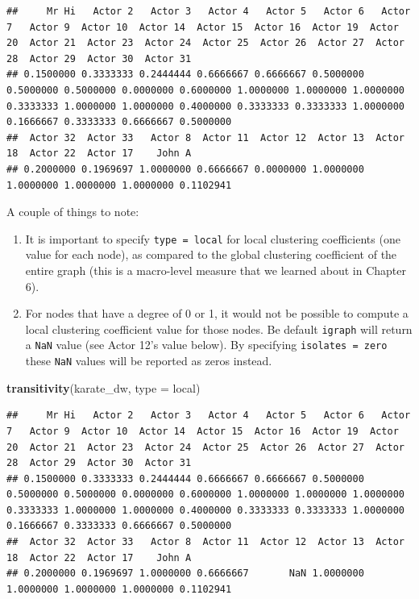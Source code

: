 \documentclass[
]{book}
\newenvironment{Shaded}{\begin{snugshade}}{\end{snugshade}}
\newcommand{\AttributeTok}[1]{\textcolor[rgb]{0.13,0.29,0.53}{#1}}
\newcommand{\FunctionTok}[1]{\textcolor[rgb]{0.13,0.29,0.53}{\textbf{#1}}}
\newcommand{\NormalTok}[1]{#1}
\newcommand{\StringTok}[1]{\textcolor[rgb]{0.31,0.60,0.02}{#1}}
\begin{document}
\begin{verbatim}
##     Mr Hi   Actor 2   Actor 3   Actor 4   Actor 5   Actor 6   Actor 7   Actor 9  Actor 10  Actor 14  Actor 15  Actor 16  Actor 19  Actor 20  Actor 21  Actor 23  Actor 24  Actor 25  Actor 26  Actor 27  Actor 28  Actor 29  Actor 30  Actor 31 
## 0.1500000 0.3333333 0.2444444 0.6666667 0.6666667 0.5000000 0.5000000 0.5000000 0.0000000 0.6000000 1.0000000 1.0000000 1.0000000 0.3333333 1.0000000 1.0000000 0.4000000 0.3333333 0.3333333 1.0000000 0.1666667 0.3333333 0.6666667 0.5000000 
##  Actor 32  Actor 33   Actor 8  Actor 11  Actor 12  Actor 13  Actor 18  Actor 22  Actor 17    John A 
## 0.2000000 0.1969697 1.0000000 0.6666667 0.0000000 1.0000000 1.0000000 1.0000000 1.0000000 0.1102941
\end{verbatim}

A couple of things to note:

\begin{enumerate}
\def\labelenumi{\arabic{enumi}.}
\item
  It is important to specify \texttt{type\ =\ local} for local clustering coefficients (one value for each node), as compared to the global clustering coefficient of the entire graph (this is a macro-level measure that we learned about in Chapter 6).
\item
  For nodes that have a degree of 0 or 1, it would not be possible to compute a local clustering coefficient value for those nodes. Be default \texttt{igraph} will return a \texttt{NaN} value (see Actor 12's value below). By specifying \texttt{isolates\ =\ \textquotesingle{}zero\textquotesingle{}} these \texttt{NaN} values will be reported as zeros instead.
\end{enumerate}

\begin{Shaded}
\begin{Highlighting}[]
\FunctionTok{transitivity}\NormalTok{(karate\_dw, }\AttributeTok{type =} \StringTok{\textquotesingle{}local\textquotesingle{}}\NormalTok{)}
\end{Highlighting}
\end{Shaded}

\begin{verbatim}
##     Mr Hi   Actor 2   Actor 3   Actor 4   Actor 5   Actor 6   Actor 7   Actor 9  Actor 10  Actor 14  Actor 15  Actor 16  Actor 19  Actor 20  Actor 21  Actor 23  Actor 24  Actor 25  Actor 26  Actor 27  Actor 28  Actor 29  Actor 30  Actor 31 
## 0.1500000 0.3333333 0.2444444 0.6666667 0.6666667 0.5000000 0.5000000 0.5000000 0.0000000 0.6000000 1.0000000 1.0000000 1.0000000 0.3333333 1.0000000 1.0000000 0.4000000 0.3333333 0.3333333 1.0000000 0.1666667 0.3333333 0.6666667 0.5000000 
##  Actor 32  Actor 33   Actor 8  Actor 11  Actor 12  Actor 13  Actor 18  Actor 22  Actor 17    John A 
## 0.2000000 0.1969697 1.0000000 0.6666667       NaN 1.0000000 1.0000000 1.0000000 1.0000000 0.1102941
\end{verbatim}
\end{document}
